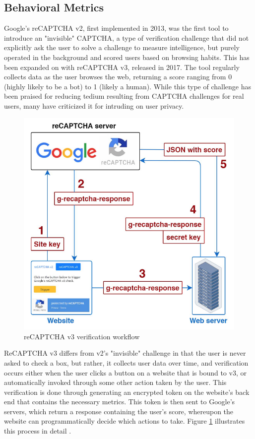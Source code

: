 \documentclass[sigplan,screen,nonacm]{acmart-tagged}
\begin{document}
\subsection{Behavioral Metrics}
\label{sec:metrics}

Google's reCAPTCHA v2, first implemented in 2013, was the first tool to introduce an "invisible" CAPTCHA, a type of verification challenge that did not explicitly ask the user to solve a challenge to measure intelligence, but purely operated in the background and scored users based on browsing habits. This has been expanded on with reCAPTCHA v3, released in 2017. The tool regularly collects data as the user browses the web, returning a score ranging from 0 (highly likely to be a bot) to 1 (likely a human). While this type of challenge has been praised for reducing tedium resulting from CAPTCHA challenges for real users, many have criticized it for intruding on user privacy.  

\begin{figure}[h]
\centering
\includegraphics[width=0.7\linewidth]{resources/v3-workflow}
\caption{reCAPTCHA v3 verification workflow \cite{tsingen}}
\label{fig:v3}
\end{figure}

ReCAPTCHA v3 differs from v2's "invisible" challenge in that the user is never asked to check a box, but rather, it collects user data over time, and verification occurs either when the user clicks a button on a website that is bound to v3, or automatically invoked through some other action taken by the user. This verification is done through generating an encrypted token on the website's back end that contains the necessary metrics. This token is then sent to Google's servers, which return a response containing the user's score, whereupon the website can programmatically decide which actions to take. Figure \ref{fig:v3} illustrates this process in detail \cite{tsingen}.
\end{document}
